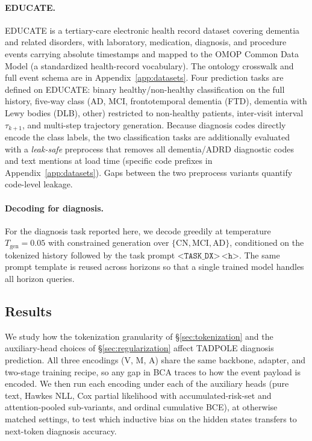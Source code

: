 \documentclass{article}
\newcommand{\ttoken}[1]{\texttt{<#1>}}
\begin{document}
\paragraph{EDUCATE.}
EDUCATE is a tertiary-care electronic health record dataset covering dementia and related disorders, with laboratory, medication, diagnosis, and procedure events carrying absolute timestamps and mapped to the OMOP Common Data Model (a standardized health-record vocabulary). The ontology crosswalk and full event schema are in Appendix~\ref{app:datasets}.
Four prediction tasks are defined on EDUCATE: binary healthy/non-healthy classification on the full history, five-way class (AD, MCI, frontotemporal dementia (FTD), dementia with Lewy bodies (DLB), other) restricted to non-healthy patients, inter-visit interval $\tau_{k+1}$, and multi-step trajectory generation.
Because diagnosis codes directly encode the class labels, the two classification tasks are additionally evaluated with a \emph{leak-safe} preprocess that removes all dementia/ADRD diagnostic codes and text mentions at load time (specific code prefixes in Appendix~\ref{app:datasets}). Gaps between the two preprocess variants quantify code-level leakage.

\paragraph{Decoding for diagnosis.}
For the diagnosis task reported here, we decode greedily at temperature $T_{\text{gen}}=0.05$ with constrained generation over $\{\text{CN},\text{MCI},\text{AD}\}$, conditioned on the tokenized history followed by the task prompt $\ttoken{TASK\_DX}\,\ttoken{h}$.
The same prompt template is reused across horizons so that a single trained model handles all horizon queries.

\subsection{Results}
\label{sec:results}

We study how the tokenization granularity of §\ref{sec:tokenization} and the auxiliary-head choices of §\ref{sec:regularization} affect TADPOLE diagnosis prediction.
All three encodings (V, M, A) share the same backbone, adapter, and two-stage training recipe, so any gap in BCA traces to how the event payload is encoded.
We then run each encoding under each of the auxiliary heads (pure text, Hawkes NLL, Cox partial likelihood with accumulated-risk-set and attention-pooled sub-variants, and ordinal cumulative BCE), at otherwise matched settings, to test which inductive bias on the hidden states transfers to next-token diagnosis accuracy.
\end{document}
